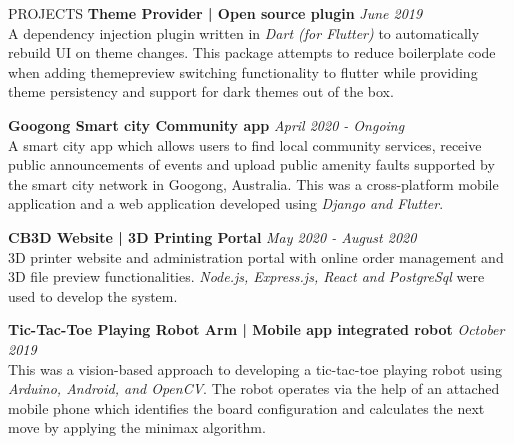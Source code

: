 \documentclass{cv}
\begin{document}
\begin{rSection}{PROJECTS}
    {\bf Theme Provider | Open source plugin}                       \hfill {\em June 2019}
    \\
    A dependency injection plugin written in \textit{Dart (for Flutter)} to automatically rebuild
    UI on theme changes.
    This package attempts to reduce boilerplate code when adding themepreview switching functionality to flutter
    while providing theme persistency and support for dark themes out of the box.
    \\ 
    \par\vspace{7pt}

    {\bf Googong Smart city Community app}                  \hfill {\em April 2020 - Ongoing}
    \\
    A smart city app which allows users to find local community services,
    receive public announcements of events and upload public amenity
    faults supported by the smart city network in Googong, Australia.
    This was a cross-platform mobile application and a web application developed
    using \textit{Django and Flutter}.
    \\ 
    \par\vspace{7pt}

    {\bf CB3D Website | 3D Printing Portal}                  \hfill {\em May 2020 - August 2020}
    \\
    3D printer website and administration portal with online order management and 3D file preview functionalities.
    \textit{Node.js, Express.js, React and PostgreSql} were used to develop the system.
    \\ 
    \par\vspace{7pt}

    {\bf Tic-Tac-Toe Playing Robot Arm | Mobile app integrated robot}     \hfill {\em October 2019}
    \\
    This was a vision-based approach to developing a tic-tac-toe playing robot using \textit{Arduino, Android, and OpenCV}.
    The robot operates via the help of an attached mobile phone which identifies the board configuration
    and calculates the next move by applying the minimax algorithm.
    \\ 
    \par\vspace{7pt}


\end{rSection}
\end{document}
